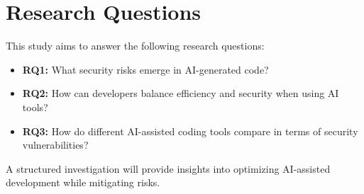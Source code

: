 \section{Research Questions}
This study aims to answer the following research questions:

\begin{itemize}
    \item \textbf{RQ1:} What security risks emerge in AI-generated code?
    \item \textbf{RQ2:} How can developers balance efficiency and security when using AI tools?
    \item \textbf{RQ3:} How do different AI-assisted coding tools compare in terms of security vulnerabilities?
\end{itemize}

A structured investigation will provide insights into optimizing AI-assisted development while mitigating risks.